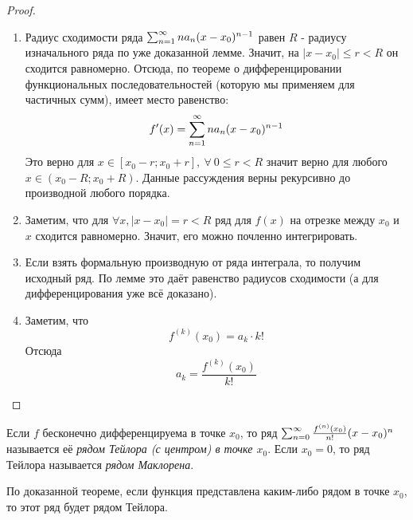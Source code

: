 \begin{proof}~
	\begin{enumerate}
		\item Радиус сходимости ряда $\sum_{n = 1}^\infty na_n(x - x_0)^{n - 1}$ равен $R$ - радиусу изначального ряда по уже доказанной лемме. Значит, на $|x - x_0| \le r < R$ он сходится равномерно. Отсюда, по теореме о дифференцировании функциональных последовательностей (которую мы применяем для частичных сумм), имеет место равенство:
		\[
			f'(x) = \sum\limits_{n = 1}^\infty na_n(x - x_0)^{n - 1}
		\]
		Это верно для $x\in[x_0-r;x_0+r],\ \forall\  0\leq r<R$ значит верно для любого $x\in(x_0-R;x_0+R)$.
		Данные рассуждения верны рекурсивно до производной любого порядка.
		
		\item Заметим, что для $\forall x, |x - x_0| = r < R$ ряд для $f(x)$ на отрезке между $x_0$ и $x$ сходится равномерно. Значит, его можно почленно интегрировать.
		
		\item Если взять формальную производную от ряда интеграла, то получим исходный ряд. По лемме это даёт равенство радиусов сходимости (а для дифференцирования уже всё доказано).
		
		\item Заметим, что
		\[
			f^{(k)}(x_0) = a_k \cdot k!
		\]
		Отсюда
		\[
			a_k = \frac{f^{(k)}(x_0)}{k!}
		\]
	\end{enumerate}
\end{proof}

\begin{definition}
	Если $f$ бесконечно дифференцируема в точке $x_0$, то ряд $\sum_{n = 0}^\infty \frac{f^{(n)}(x_0)}{n!}(x - x_0)^n$ называется её \textit{рядом Тейлора (с центром) в точке $x_0$}. Если $x_0 = 0$, то ряд Тейлора называется \textit{рядом Маклорена}.
\end{definition}

\begin{note}
	По доказанной теореме, если функция представлена каким-либо рядом в точке $x_0$, то этот ряд будет рядом Тейлора.
\end{note}

